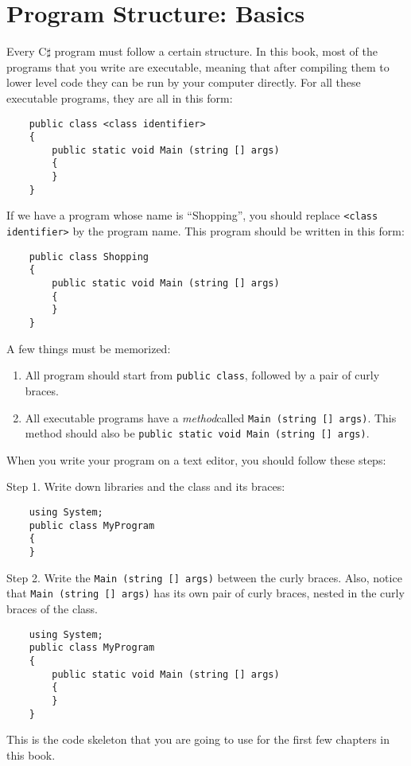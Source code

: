 \documentclass[../main.tex]{subfiles}
\begin{document}
    \section{Program Structure: Basics}
    Every C$\sharp$ program must follow a certain structure. In this book, most
    of the programs that you write are executable, meaning that after compiling
    them to lower level code they can be run by your computer directly. For all
    these executable programs, they are all in this form:

\begin{verbatim}
    public class <class identifier>
    {
        public static void Main (string [] args)
        {
        }
    }
\end{verbatim}

If we have a program whose name is ``Shopping'', you should replace
\texttt{<class identifier>} by the program name. This program should be written
in this form:

\begin{verbatim}
    public class Shopping
    {
        public static void Main (string [] args)
        {
        }
    }
\end{verbatim}

A few things must be memorized:
\begin{enumerate}
    \item All program should start from \texttt{public class}, followed by a
    pair of curly braces.
    \item All executable programs have a \emph{method}called
    \texttt{Main (string [] args)}. This method should also be
    \texttt{public static void Main (string [] args)}.
\end{enumerate}


When you write your program on a text editor, you should follow these steps:

Step 1. Write down libraries and the class and its braces:

\begin{verbatim}
    using System;
    public class MyProgram
    {
    }
\end{verbatim}

Step 2. Write the \texttt{Main (string [] args)} between the curly braces. Also,
notice that \texttt{Main (string [] args)} has its own pair of curly braces,
nested in the curly braces of the class.

\begin{verbatim}
    using System;
    public class MyProgram
    {
        public static void Main (string [] args)
        {
        }
    }
\end{verbatim}
This is the code skeleton that you are going to use for the first few chapters in this book.
\end{document}

